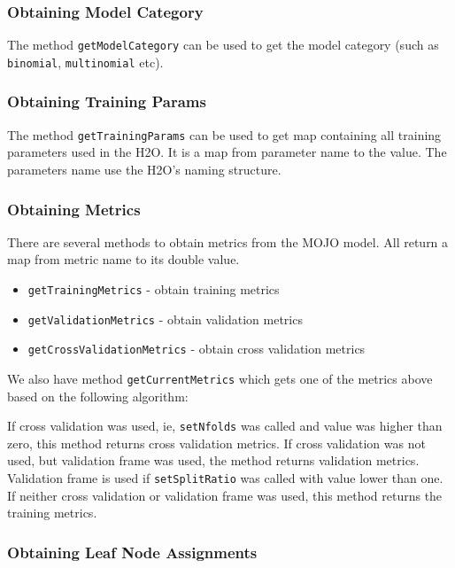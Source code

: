 \subsubsection{Obtaining Model Category}

The method \texttt{getModelCategory} can be used to get the model category (such as \texttt{binomial}, \texttt{multinomial} etc).

\subsubsection{Obtaining Training Params}

The method \texttt{getTrainingParams} can be used to get map containing all training parameters used in the H2O. It is a map
from parameter name to the value. The parameters name use the H2O's naming structure.


\subsubsection{Obtaining Metrics}

There are several methods to obtain metrics from the MOJO model. All return a map from metric name to its double value.

\begin{itemize}
    \item \texttt{getTrainingMetrics} - obtain training metrics
    \item \texttt{getValidationMetrics} - obtain validation metrics
    \item \texttt{getCrossValidationMetrics} - obtain cross validation metrics
\end{itemize}


We also have method \texttt{getCurrentMetrics} which gets one of the metrics above based on the following algorithm:

If cross validation was used, ie, \texttt{setNfolds} was called and value was higher than zero, this method returns cross validation
metrics. If cross validation was not used, but validation frame was used, the method returns validation metrics. Validation
frame is used if \texttt{setSplitRatio} was called with value lower than one. If neither cross validation or validation frame
was used, this method returns the training metrics.

\subsubsection{Obtaining Leaf Node Assignments}

